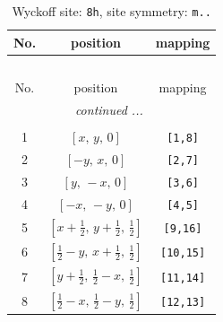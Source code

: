 \documentclass[fleqn,8pt]{jsarticle}
\begin{document}
\begin{longtable}{ccc}
\caption{Wyckoff site: {\tt 8h}, site symmetry: {\tt m..}}
 \\
 \hline \hline
No. & position & mapping \\ \hline \endfirsthead

\multicolumn{2}{l}{\tablename\ \thetable{}} \\
 \hline \hline
No. & position & mapping \\ \hline \endhead

 \hline \hline
\multicolumn{2}{r}{\footnotesize\it continued ...} \\ \endfoot

 \hline \hline
\multicolumn{2}{r}{} \\ \endlastfoot

1 & $\left[ x,\, y,\, 0 \right]$ & {\tt [1,8]} \\ \hline
2 & $\left[ - y,\, x,\, 0 \right]$ & {\tt [2,7]} \\ \hline
3 & $\left[ y,\, - x,\, 0 \right]$ & {\tt [3,6]} \\ \hline
4 & $\left[ - x,\, - y,\, 0 \right]$ & {\tt [4,5]} \\ \hline
5 & $\left[ x + \frac{1}{2},\, y + \frac{1}{2},\, \frac{1}{2} \right]$ & {\tt [9,16]} \\ \hline
6 & $\left[ \frac{1}{2} - y,\, x + \frac{1}{2},\, \frac{1}{2} \right]$ & {\tt [10,15]} \\ \hline
7 & $\left[ y + \frac{1}{2},\, \frac{1}{2} - x,\, \frac{1}{2} \right]$ & {\tt [11,14]} \\ \hline
8 & $\left[ \frac{1}{2} - x,\, \frac{1}{2} - y,\, \frac{1}{2} \right]$ & {\tt [12,13]} \\
\end{longtable}
\renewcommand{\arraystretch}{1.2}
\end{document}
